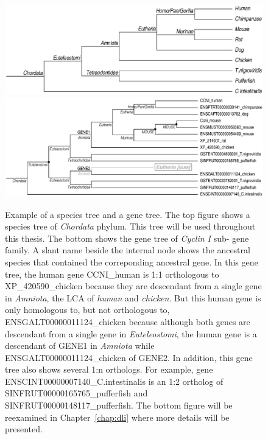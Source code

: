 \begin{figure}[!hb]
\includegraphics[width=\textwidth]{spec}
\includegraphics[width=\textwidth]{gtree}
\caption[Examples of a species tree and a gene tree]
	{Example of a species tree and a gene tree. The top figure shows a species tree of {\it Chordata} phylum.
	This tree will be used throughout this thesis.
	The bottom shows the gene tree of {\it Cyclin I} sub- gene family. A slant name beside the internal node
	shows the ancestral species that contained the correponding ancestral gene. In this gene tree,
	the human gene {\sf CCNI\_human} is 1:1 orthologous to {\sf XP\_420590\_chicken} because
	they are descendant from a single gene in {\it Amniota}, the LCA of {\it human} and {\it chicken}. But this human gene is only
	homologous to, but not orthologous to,
	{\sf ENSGALT00000011124\_chicken} because although both genes
	are descendant from a single gene in {\it Euteleostomi}, the human gene is a descendant of {\sf GENE1} in {\it Amniota}
	while {\sf ENSGALT00000011124\_chicken} of {\sf GENE2}. In addition, this gene tree also shows several 1:n orthologs.
	For example, gene {\sf ENSCINT00000007140\_C.intestinalis} is an 1:2 ortholog of {\sf SINFRUT00000165765\_pufferfish}
	and {\sf SINFRUT00000148117\_pufferfish}. The bottom figure will be reexamined in Chapter~\ref{chap:dli}
	where more details will be presented.}\label{fig:spectree}
\end{figure}

